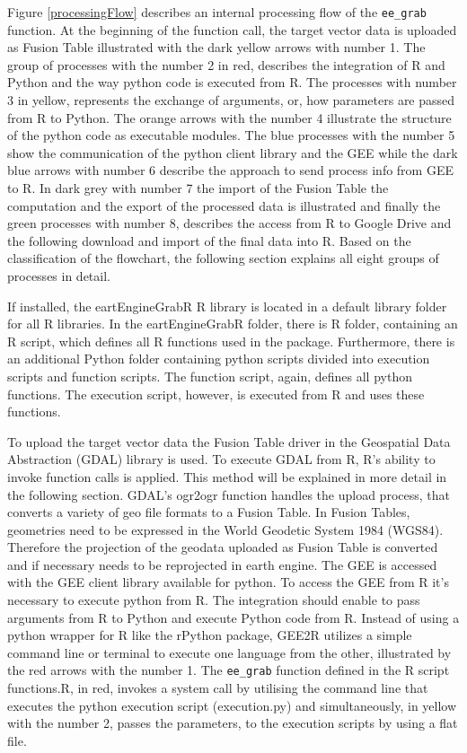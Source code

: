 Figure \ref{processingFlow} describes an internal processing flow of the \texttt{ee\_grab} function.
At the beginning of the function call, the target vector data is uploaded as Fusion Table illustrated with the dark yellow arrows with number 1. 
The group of processes with the number 2 in red, describes the integration of R and Python and the way python code is executed from R. The processes with number 3 in yellow, represents the exchange of arguments, or,  how parameters are passed from R to Python. The orange arrows with the number 4 illustrate the structure of the python code as executable modules. The blue processes with the number 5 show the communication of the python client library and the GEE while the dark blue arrows with number 6 describe the approach to send process info from GEE to R. In dark grey with number 7 the import of the Fusion Table the computation and the export of the processed data is illustrated and finally the green processes with number 8, describes the access from R to Google Drive and the following download and import of the final data into R.
Based on the classification of the flowchart, the following section explains all eight groups of processes in detail.

If installed, the eartEngineGrabR R library is located in a default library folder for all R libraries. In the eartEngineGrabR folder, there is R folder, containing an R script, which defines all R functions used in the package. Furthermore, there is an additional Python folder containing python scripts divided into execution scripts and function scripts. The function script, again, defines all python functions. The execution script, however, is executed from R and uses these functions.

To upload the target vector data the Fusion Table driver in the Geospatial Data Abstraction (GDAL) library is used. To execute GDAL from R, R's ability to invoke function calls is applied. This method will be explained in more detail in the following section. GDAL's ogr2ogr function handles the upload process, that converts a variety of geo file formats to a Fusion Table. In Fusion Tables, geometries need to be expressed in the World Geodetic System 1984 (WGS84). Therefore the projection of the geodata uploaded as Fusion Table is converted and if necessary needs to be reprojected in earth engine.
The GEE is accessed with the GEE client library available for python. To access the GEE from R it's necessary to execute python from R. The integration should enable to pass arguments from R to Python and execute Python code from R. Instead of using a python wrapper for R like the rPython package, GEE2R utilizes a simple command line or terminal to execute one language from the other, illustrated by the red arrows with the number 1. The \texttt{ee\_grab} function defined in the R script functions.R, in red, invokes a system call by utilising the command line that executes the python execution script (execution.py) and simultaneously, in yellow with the number 2, passes the parameters, to the execution scripts by using a flat file. 

